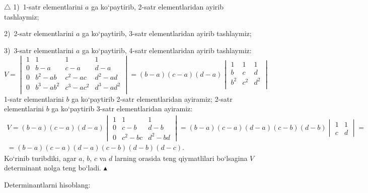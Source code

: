 \begin{enumerate}
$\triangle$ 1)\ 1-satr elementlarini $a$ ga ko`paytirib, 2-satr elementlaridan ayirib tashlaymiz; 

2)\ 2-satr elementlarini $a$ ga ko`paytirib, 3-satr elementlaridan ayirib tashlaymiz; 

3)\ 3-satr elementlarini $a$ ga ko`paytirib, 4-satr elementlaridan ayirib tashlaymiz:
$$V=\begin{vmatrix}
	1&1&1&1\\
	0&b-a&c-a&d-a\\
	0&b^{2}-ab&c^{2}-ac&d^{2}-ad\\
	0&b^{3}-ab^{2}&c^{3}-ac^{2}&d^{3}-ad^{2}\\
\end{vmatrix}=(b-a)(c-a)(d-a)
\begin{vmatrix}
1&1&1\\
b&c&d\\
b^{2}&c^{2}&d^{2}\\
\end{vmatrix}$$
1-satr elementlarini $b$ ga ko`paytirib 2-satr elementlaridan ayiramiz; 2-satr elementlarini $b$ ga ko`paytirib 3-satr elementlaridan ayiramiz:
\begin{multline*}
	V=(b-a)(c-a)(d-a)\begin{vmatrix}
	1&1&1\\
	0&c-b&d-b\\
	0&c^{2}-bc&d^{2}-bd
\end{vmatrix}=(b-a)(c-a)(d-a)(c-b)(d-b)\begin{vmatrix}
1&1\\
c&d
\end{vmatrix}=\\=(b-a)(c-a)(d-a)(c-b)(d-b)(d-c).
\end{multline*}
Ko`rinib turibdiki, agar $a$, $b$, $c$ va $d$ larning  orasida teng qiymatlilari bo`lsagina $V$ determinant nolga teng bo`ladi. $\blacktriangle$
\end{enumerate}
Determinantlarni hisoblang:
